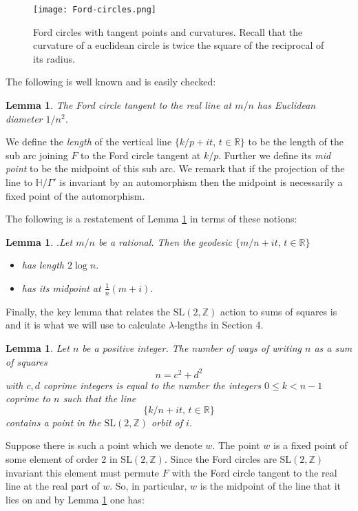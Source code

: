 \documentclass[12pt,a4paper]{amsart}
\newtheorem{lem}[thm]{Lemma}
\def\HH{\mathbb{H}}
\def\xx{\HH/\Gamma'}
\def\ZZ{\mathbb{Z}}
\def\RR{\mathbb{R}}
\def\sl2{\mathrm{SL}(2, \ZZ)}
\begin{document}
\begin{figure}[ht]
\begin{center}
\texttt{[image: Ford-circles.png]} 
\end{center}
\caption{Ford circles with tangent points and curvatures.
Recall that the curvature of a euclidean circle is twice  the square of  the reciprocal of its radius.}
\end{figure}

The following is well known and is easily checked:

\begin{lem}\label{ford}
The Ford circle tangent to the real line at $m/n$
has Euclidean diameter $1/n^2$.
\end{lem}


We define the \textit{length} of the vertical line 
$\{ k/p + i t,\, t \in \RR \}$
to be the length of the  sub arc joining 
$F$ to the Ford circle tangent at $k/p$.
Further we define its  \textit{mid point} to be the midpoint of this sub arc.
We remark that if the projection of the line to $\xx$
is invariant by an automorphism 
then the midpoint is necessarily a fixed point of the automorphism.

The following is a restatement of Lemma \ref{ford} in terms of these notions:

\begin{lem}.\label{calcul}
Let $m/n$ be a rational. 
Then the geodesic $\{ m/n + i t,\, t \in \RR \}$
\begin{itemize}
\item has  length $2\log n$. 
\item has its midpoint at $ \frac{1 }{n}(m + i).$
\end{itemize}
\end{lem}

Finally, the key lemma that relates the $\sl2$ action to sums of squares is
and it is what we will use to calculate $\lambda$-lengths in Section 4.

\begin{lem} \label{squares}
Let $n$ be a positive integer.
The number of  ways of writing $n$  as a  sum of squares
$$n = c^2 + d^2$$
with $c,d$ coprime integers
is equal to the number the  integers $0 \leq k < n-1$ coprime to $n$
such that the line
$$\{  k/n + i t,\, t \in \RR \}$$
contains  a point in the $\sl2$  orbit of $i$.
\end{lem}


\proof  Suppose there is such  a point which we denote  $w$.
The point $w$ is a fixed point of some  element of order 2 in $\sl2$.
Since the Ford circles are $\sl2$ invariant
this element must permute $F$ with the Ford circle tangent 
to the real line  at the real part of $w$.
So, in particular, $w$ is the midpoint of the line 
that it lies on 
and by  Lemma \ref{calcul} one has:
\end{document}
